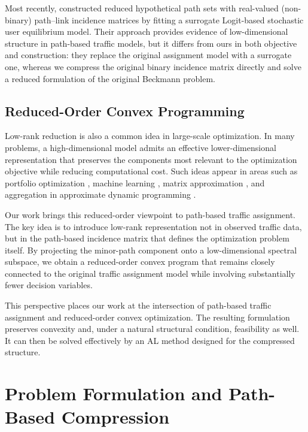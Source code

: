 \documentclass[11pt]{article}
\begin{document}
Most recently, \cite{zhang2025lowrank} constructed reduced hypothetical path sets with real-valued (non-binary) path--link incidence matrices by fitting a surrogate Logit-based stochastic user equilibrium model. Their approach provides evidence of low-dimensional structure in path-based traffic models, but it differs from ours in both objective and construction: they replace the original assignment model with a surrogate one, whereas we compress the original binary incidence matrix directly and solve a reduced formulation of the original Beckmann problem.

\subsection{Reduced-Order Convex Programming}

Low-rank reduction is also a common idea in large-scale optimization. In many problems, a high-dimensional model admits an effective lower-dimensional representation that preserves the components most relevant to the optimization objective while reducing computational cost. Such ideas appear in areas such as portfolio optimization \cite{markowitz1952portfolio, ross1976arbitrage, chopra1993effect}, machine learning \cite{vapnik1995nature, scholkopf1998nonlinear, rahimi2008random}, matrix approximation \cite{eckart1936approximation, golub1965svd, sirovich1987low, sarwar2000application, koren2009matrix, candes2009exact}, and aggregation in approximate dynamic programming \cite{bertsekas2012dynamic,bertsekas2019reinforcement}.

Our work brings this reduced-order viewpoint to path-based traffic assignment. The key idea is to introduce low-rank representation not in observed traffic data, but in the path-based incidence matrix that defines the optimization problem itself. By projecting the minor-path component onto a low-dimensional spectral subspace, we obtain a reduced-order convex program that remains closely connected to the original traffic assignment model while involving substantially fewer decision variables.

This perspective places our work at the intersection of path-based traffic assignment and reduced-order convex optimization. The resulting formulation preserves convexity and, under a natural structural condition, feasibility as well. It can then be solved effectively by an AL method designed for the compressed structure.



\section{Problem Formulation and Path-Based Compression}\label{sec:compression_framework}
\end{document}
